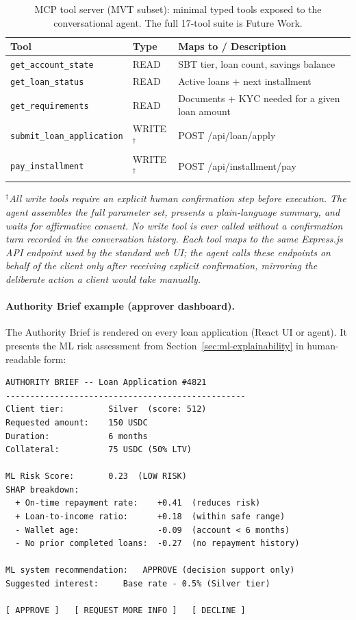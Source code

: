 \documentclass[12pt,a4paper]{report}
\newcommand{\tableheadcolor}{\rowcolor{TableHeadBg}}
\begin{document}
\begin{table}[H]
\centering
\caption[MCP tool server (MVT subset)]{MCP tool server (MVT subset): minimal typed tools exposed to the conversational agent. The full 17-tool suite is Future Work.}
\label{tab:mcp-tools}
\begin{tabular}{p{4.8cm}p{1.4cm}p{6.3cm}}
\toprule
\tableheadcolor
\textbf{Tool} & \textbf{Type} & \textbf{Maps to / Description} \\
\midrule
\texttt{get\_account\_state}       & READ & SBT tier, loan count, savings balance \\
\texttt{get\_loan\_status}         & READ & Active loans + next installment \\
\texttt{get\_requirements}         & READ & Documents + KYC needed for a given loan amount \\
\texttt{submit\_loan\_application} & WRITE$^{\dagger}$ & POST /api/loan/apply \\
\texttt{pay\_installment}          & WRITE$^{\dagger}$ & POST /api/installment/pay \\
\bottomrule
\end{tabular}

\vspace{4pt}
\noindent\small$^{\dagger}$\textit{All write tools require an explicit human confirmation step before execution. The agent assembles the full parameter set, presents a plain-language summary, and waits for affirmative consent. No write tool is ever called without a confirmation turn recorded in the conversation history. Each tool maps to the same Express.js API endpoint used by the standard web UI; the agent calls these endpoints on behalf of the client only after receiving explicit confirmation, mirroring the deliberate action a client would take manually.}
\end{table}

\paragraph{Authority Brief example (approver dashboard).}

The Authority Brief is rendered on every loan application (React UI or agent). It presents the ML risk assessment from Section~\ref{sec:ml-explainability} in human-readable form:

\begin{verbatim}
AUTHORITY BRIEF -- Loan Application #4821
-------------------------------------------------
Client tier:         Silver  (score: 512)
Requested amount:    150 USDC
Duration:            6 months
Collateral:          75 USDC (50% LTV)

ML Risk Score:       0.23  (LOW RISK)
SHAP breakdown:
  + On-time repayment rate:    +0.41  (reduces risk)
  + Loan-to-income ratio:      +0.18  (within safe range)
  - Wallet age:                -0.09  (account < 6 months)
  - No prior completed loans:  -0.27  (no repayment history)

ML system recommendation:   APPROVE (decision support only)
Suggested interest:     Base rate - 0.5% (Silver tier)

[ APPROVE ]   [ REQUEST MORE INFO ]   [ DECLINE ]
\end{verbatim}
\end{document}
